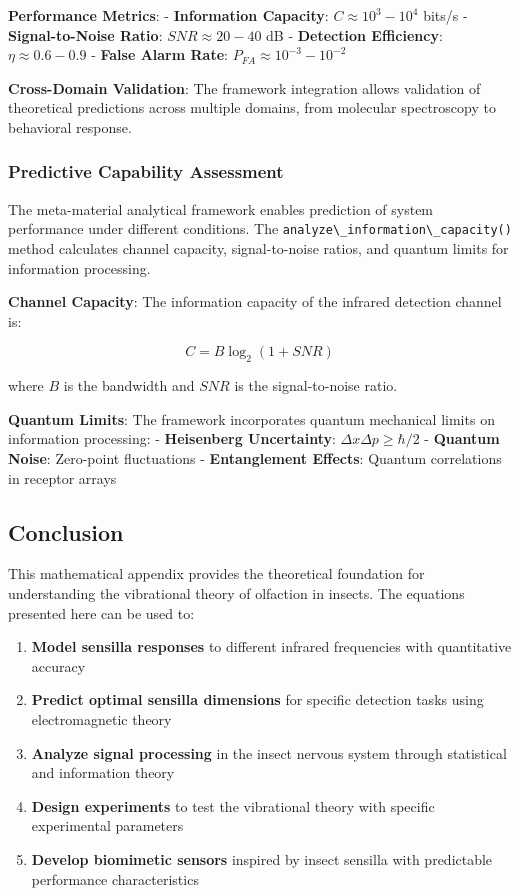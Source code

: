 \documentclass[
  13pt,
  a4paperpaper,
  12pt]{article}
\newcommand{\passthrough}[1]{#1}
\providecommand{\tightlist}{%
  \setlength{\itemsep}{0pt}\setlength{\parskip}{0pt}}
\begin{document}
\textbf{Performance Metrics}: - \textbf{Information Capacity}:
\(C \approx 10^3-10^4\) bits/s - \textbf{Signal-to-Noise Ratio}:
\(SNR \approx 20-40\) dB - \textbf{Detection Efficiency}:
\(\eta \approx 0.6-0.9\) - \textbf{False Alarm Rate}:
\(P_{FA} \approx 10^{-3}-10^{-2}\)

\textbf{Cross-Domain Validation}: The framework integration allows
validation of theoretical predictions across multiple domains, from
molecular spectroscopy to behavioral response.

\subsubsection{Predictive Capability
Assessment}\label{predictive-capability-assessment}

The meta-material analytical framework enables prediction of system
performance under different conditions. The
\passthrough{\lstinline!analyze\_information\_capacity()!} method
calculates channel capacity, signal-to-noise ratios, and quantum limits
for information processing.

\textbf{Channel Capacity}: The information capacity of the infrared
detection channel is:

\begin{equation}
C = B \log_2(1 + SNR)
\label{eq:channel_capacity_empirical}
\end{equation}

where \(B\) is the bandwidth and \(SNR\) is the signal-to-noise ratio.

\textbf{Quantum Limits}: The framework incorporates quantum mechanical
limits on information processing: - \textbf{Heisenberg Uncertainty}:
\(\Delta x \Delta p \geq \hbar/2\) - \textbf{Quantum Noise}: Zero-point
fluctuations - \textbf{Entanglement Effects}: Quantum correlations in
receptor arrays

\subsection{Conclusion}\label{conclusion}

This mathematical appendix provides the theoretical foundation for
understanding the vibrational theory of olfaction in insects. The
equations presented here can be used to:

\begin{enumerate}
\def\labelenumi{\arabic{enumi}.}
\tightlist
\item
  \textbf{Model sensilla responses} to different infrared frequencies
  with quantitative accuracy
\item
  \textbf{Predict optimal sensilla dimensions} for specific detection
  tasks using electromagnetic theory
\item
  \textbf{Analyze signal processing} in the insect nervous system
  through statistical and information theory
\item
  \textbf{Design experiments} to test the vibrational theory with
  specific experimental parameters
\item
  \textbf{Develop biomimetic sensors} inspired by insect sensilla with
  predictable performance characteristics
\end{enumerate}
\end{document}
